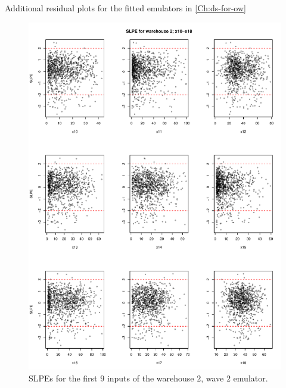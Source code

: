 \begin{chapter}{Additional residual plots  for the fitted emulators in \cref{Ch:ds-for-ow} \label{App:resid}}
\begin{figure}
  \centering
  \includegraphics[width=\textwidth]{fig-app-ds/w2-w2-2.pdf}
  \caption{SLPEs for the first $9$ inputs of the warehouse $2$, wave $2$ emulator.}
\end{figure}
\end{chapter}
